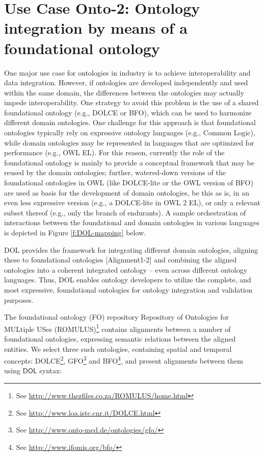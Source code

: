 \documentclass[10pt,%
\ifpretendfinal
final%
\else
draft%
\fi,
]{scrreprt}
\newcommand*{\DOL}{\ensuremath{\mathsf{DOL}}\xspace}
\begin{document}
\section{Use Case Onto-2: Ontology integration by means of a foundational ontology}
One major use case for ontologies in industry is to achieve interoperability and data integration. 
However, if ontologies are developed independently and used  within the same domain, the 
differences between the ontologies may actually impede interoperability. One strategy to avoid this 
problem is the use of a shared  foundational ontology (e.g., DOLCE or BFO), which can be used to 
harmonize different domain ontologies. One challenge for this approach is that foundational 
ontologies typically rely on expressive ontology languages (e.g., Common Logic), while domain 
ontologies may be represented in languages that are optimized for performance (e.g., OWL EL). For 
this reason, currently the role of the foundational ontology is mainly to provide a conceptual 
framework that may be reused by the  domain ontologies; further, watered-down versions of the 
foundational ontologies in OWL (like DOLCE-lite or the OWL version of BFO) are used as basis for 
the  development of domain ontologies, be this as is, in an even less expressive version (e.g., a 
DOLCE-lite in OWL 2 EL), or only a relevant subset thereof (e.g., only the branch of endurants). A 
sample orchestration of interactions between the foundational and domain ontologies in various 
languages is depicted in Figure \ref{f:DOL-mapping} below.

DOL  provides the framework for integrating different domain ontologies, aligning these to 
foundational ontologies [Alignment1-2] and combining the aligned ontologies into a coherent 
integrated ontology -- even across different ontology languages. Thus, DOL  enables ontology 
developers to utilize the complete, and most expressive, foundational ontologies for ontology 
integration and validation purposes. 

The foundational ontology (FO) repository Repository of Ontologies for MULtiple USes (ROMULUS)\footnote{See \url{http://www.thezfiles.co.za/ROMULUS/home.html}}
contains alignments between a number of foundational ontologies, expressing semantic relations between the aligned
entities. We select three such ontologies, containing spatial and temporal concepts: DOLCE\footnote{See \url{http://www.loa.istc.cnr.it/DOLCE.html}}, GFO\footnote{See \url{http://www.onto-med.de/ontologies/gfo/}} and BFO\footnote{See \url{http://www.ifomis.org/bfo/}}, and present alignments between them 
using \DOL syntax:
\end{document}
